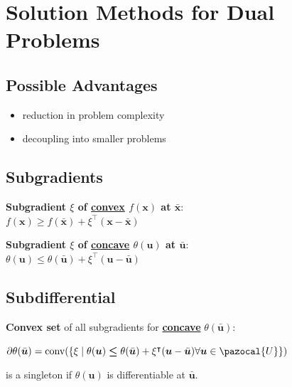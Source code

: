 \documentclass[english]{latex4ei/latex4ei_sheet}
\begin{document}
\pagebreak

\section{Solution Methods for Dual Problems}

\begin{sectionbox}
	\subsection{Possible Advantages}
	\begin{itemize}
		\item reduction in problem complexity
		\item decoupling into smaller problems
	\end{itemize}
\end{sectionbox}

\begin{sectionbox}
	\subsection{Subgradients}
	\begin{emphbox}
		\textbf{Subgradient $\xi$ of \underline{convex} $f(\bm{x})$ at $\bar{\bm{x}}$}: \\
		\vspace{0.3em}
		$f(\bm{x}) \bm{\geq} f(\bar{\bm{x}}) + \xi^\intercal(\bm{x} - \bar{\bm{x}})$
	\end{emphbox}
	\begin{emphbox}
		\textbf{Subgradient $\xi$ of \underline{concave} $\theta(\bm{u})$ at $\bar{\bm{u}}$}: \\
		\vspace{0.3em}
		$\theta(\bm{u}) \bm{\leq} \theta(\bar{\bm{u}}) + \xi^\intercal(\bm{u} - \bar{\bm{u}})$
	\end{emphbox}

	\subsection{Subdifferential}
	\textbf{Convex set} of all subgradients for \textbf{\underline{concave}} $\theta(\bar{\bm{u}})$:
	\vspace{0.3em}
	\begin{center}
		$\partial \theta(\bar{\bm{u}}) = \text{conv}(\{ \xi \mid \theta(\bm{u}) \bm{\leq} \theta(\bar{\bm{u}}) + \xi^\intercal(\bm{u} - \bar{\bm{u}}) \forall \bm{u} \in \pazocal{U} \})$
	\end{center}
	is a singleton if $\theta(\bm{u})$ is differentiable at $\bar{\bm{u}}$.

\end{sectionbox}
\end{document}
